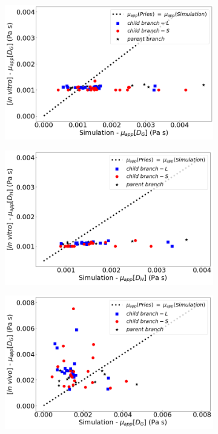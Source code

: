 \begin{figure}[H]
\centering
\begin{subfigure}{0.48 \textwidth}
    \includegraphics[width=1\textwidth]{images/InVitroApparentViscosityDG.png}
    \caption{\textit{} \label{InVitroApparentViscosityDG}}
\end{subfigure}
\hfill
\begin{subfigure}{0.48 \textwidth}
    \includegraphics[width=1\textwidth]{images/InVitroApparentViscosityDH.png}
    \caption{\textit{} \label{InVitroApparentViscosityDH}}
\end{subfigure}
\begin{subfigure}{0.48 \textwidth}
    \includegraphics[width=1\textwidth]{images/InVivoApparentViscosityDG.png}

\end{subfigure}
\end{figure}
